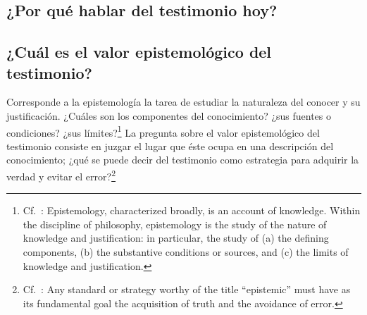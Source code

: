 \subsection{¿Por qué hablar del testimonio hoy?}

\subsection{¿Cuál es el valor epistemológico del testimonio?}
Corresponde a la epistemología la tarea de estudiar la naturaleza del conocer y
su justificación. ¿Cuáles son los componentes del conocimiento? ¿sus fuentes o
condiciones? ¿sus límites?\footnote{Cf.~\cite[3]{moser2002ep}: Epistemology,
  characterized broadly, is an account of knowledge. Within the discipline of
  philosophy, epistemology is the study of the nature of knowledge and
  justification: in particular, the study of (a) the defining components, (b)
  the substantive conditions or sources, and (c) the limits of knowledge and
  justification.} La pregunta sobre el valor epistemológico del testimonio
consiste en juzgar el lugar que éste ocupa en una descripción del conocimiento;
¿qué se puede decir del testimonio como estrategia para adquirir la verdad y
evitar el error?\footnote{Cf.~\cite[14]{moser2002ep}: Any standard or strategy
  worthy of the title ``epistemic'' must have as its fundamental goal the
  acquisition of truth and the avoidance of error.}


